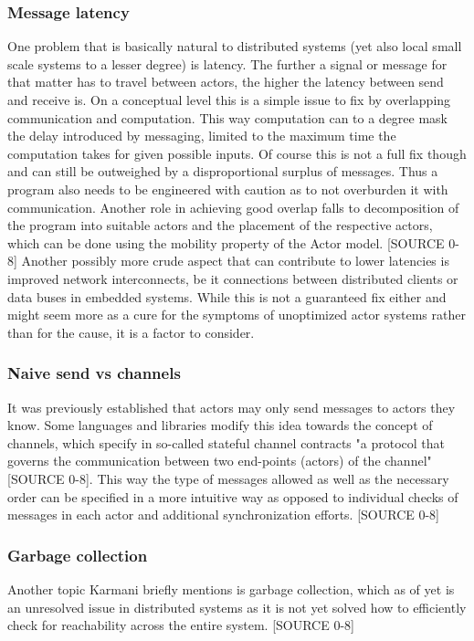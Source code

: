\documentclass[A4]{article}
\begin{document}
\subsubsection{Message latency}
One problem that is basically natural to distributed systems (yet also local small scale systems to a lesser degree) is latency. The further a signal or message for that matter has to travel between actors, the higher the latency between send and receive is. 
On a conceptual level this is a simple issue to fix by overlapping communication and computation. This way computation can to a degree mask the delay introduced by messaging, limited to the maximum time the computation takes for given possible inputs. Of course this is not a full fix though and can still be outweighed by a disproportional surplus of messages. Thus a program also needs to be engineered with caution as to not overburden it with communication. Another role in achieving good overlap falls to decomposition of the program into suitable actors and the placement of the respective actors, which can be done using the mobility property of the Actor model. [SOURCE 0-8]
Another possibly more crude aspect that can contribute to lower latencies is improved network interconnects, be it connections between distributed clients or data buses in embedded systems. While this is not a guaranteed fix either and might seem more as a cure for the symptoms of unoptimized actor systems rather than for the cause, it is a factor to consider.
\subsubsection{Naive send vs channels}
It was previously established that actors may only send messages to actors they know. Some languages and libraries modify this idea towards the concept of channels, which specify in so-called stateful channel contracts "a protocol that governs the communication between two end-points (actors) of the channel" [SOURCE 0-8]. This way the type of messages allowed as well as the necessary order can be specified in a more intuitive way as opposed to individual checks of messages in each actor and additional synchronization efforts. [SOURCE 0-8]
\subsubsection{Garbage collection}
Another topic Karmani briefly mentions is garbage collection, which as of yet is an unresolved issue in distributed systems as it is not yet solved how to efficiently check for reachability across the entire system. [SOURCE 0-8]
\end{document}
